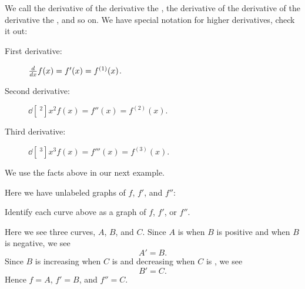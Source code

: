 \documentclass{ximera}
\begin{document}
We call the derivative of the derivative the , the derivative of the derivative of the derivative the
, and so on. We have special notation for
higher derivatives, check it out:
\begin{description}
\item[First derivative:] $\frac{d}{\mathop{}\!d x} f(x) = f'(x) = f^{(1)}(x)$.
\item[Second derivative:] $\dd[~^2]{x^2} f(x) = f''(x) = f^{(2)}(x)$.
\item[Third derivative:] $\dd[~^3]{x^3} f(x) = f'''(x) = f^{(3)}(x)$.
\end{description}

We use the facts above in our next example.

\begin{example}
  Here we have unlabeled graphs of $f$, $f'$, and $f''$:
  \begin{image}
  \end{image}
  Identify each curve above as a graph of $f$, $f'$, or $f''$.
  \begin{explanation} 
    Here we see three curves, $A$, $B$, and $C$. Since $A$ is
     when $B$ is
    positive and
    when $B$ is negative, we see
    \[
    A'=B.
    \]
    Since $B$ is increasing when $C$ is
     and decreasing when $C$ is
    , we see
    \[
    B'=C.
    \]
    Hence $f=A$, $f'=B$, and $f''=C$.
  \end{explanation}
\end{example}
\end{document}
